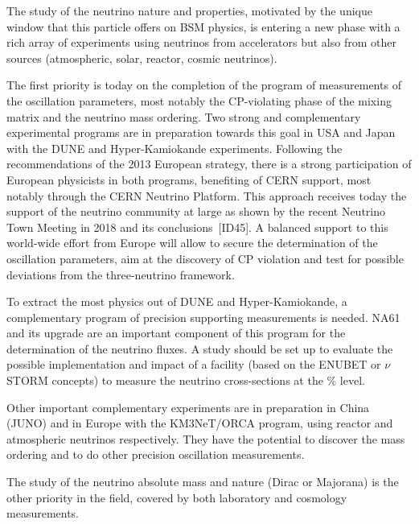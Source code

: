 
The study of the neutrino nature and properties, motivated by the unique window that this particle offers on BSM physics, is entering a new phase with a rich array of experiments using neutrinos from accelerators but also from other sources (atmospheric, solar, reactor, cosmic neutrinos).

The first priority is today on the completion of the program of measurements of the oscillation parameters, most notably the CP-violating phase of the mixing matrix and the neutrino mass ordering. 
Two strong and complementary experimental programs are in preparation towards this goal in USA and Japan with the DUNE and Hyper-Kamiokande experiments. Following the recommendations of the 2013 European strategy, there is a strong participation of European physicists in both programs, benefiting of CERN support, most notably through the CERN Neutrino Platform. This approach receives today the support of the neutrino community at large as shown by the recent Neutrino Town Meeting in 2018 and its conclusions~[ID45]. A balanced support to this world-wide effort from Europe will allow to secure the determination of the oscillation parameters, aim at the discovery of CP violation and test for possible deviations from the three-neutrino framework.

To extract the most physics out of DUNE and Hyper-Kamiokande, a complementary program of precision supporting measurements is needed. 
NA61 and its upgrade are an important component of this program for the determination of the neutrino fluxes. A study should be set up to evaluate the possible implementation and impact of a facility (based on the ENUBET or $\nu$STORM concepts) to measure the neutrino cross-sections at the \% level.

Other important complementary experiments are in preparation in China (JUNO) and in Europe with the KM3NeT/ORCA program, using reactor and atmospheric neutrinos respectively. They have the potential to discover the mass ordering and to do other precision oscillation measurements.

The study of the neutrino absolute mass and nature (Dirac or Majorana) is the other priority in the field, covered by both laboratory and cosmology measurements.
